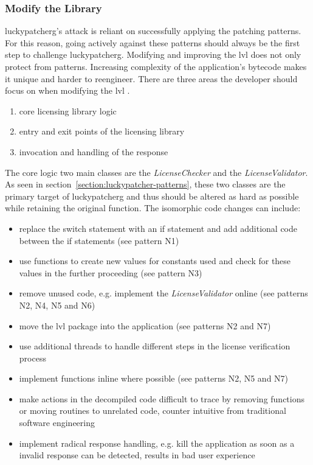 \subsubsection{Modify the Library} \label{subsection:counter-modifications-library}
\gls{luckypatcherg}'s attack is reliant on successfully applying the patching patterns.
For this reason, going actively against these patterns should always be the first step to challenge \gls{luckypatcherg}.
Modifying and improving the \gls{lvl} does not only protect from patterns.
Increasing complexity of the application's bytecode makes it unique and harder to reengineer. \cite{developersSecuring}
\newline
There are three areas the developer should focus on when modifying the \gls{lvl}  \cite{developersSecuring}.
\begin{enumerate}
\item core licensing library logic
\item entry and exit points of the licensing library
\item invocation and handling of the response
\end{enumerate}
The core logic two main classes are the \textit{LicenseChecker} and the \textit{LicenseValidator}.
As seen in section~\ref{section:luckypatcher-patterns}, these two classes are the primary target of \gls{luckypatcherg} and thus should be altered as hard as possible while retaining the original function.
The isomorphic code changes can include:
\begin{itemize}
\item replace the switch statement with an if statement and add additional code between the if statements (see pattern N1)
\item use functions to create new values for constants used and check for these values in the further proceeding (see pattern N3)
\item remove unused code, e.g. implement the \textit{LicenseValidator} online (see patterns N2, N4, N5 and N6)
\item move the \gls{lvl} package into the application (see patterns N2 and N7)
\item use additional threads to handle different steps in the license verification process
\item implement functions inline where possible (see patterns N2, N5 and N7)
\item make actions in the decompiled code difficult to trace by removing functions or moving routines to unrelated code, counter intuitive from traditional software engineering
\item implement radical response handling, e.g. kill the application as soon as a invalid response can be detected, results in bad user experience
\end{itemize}
